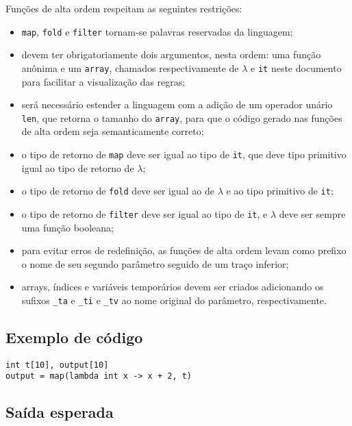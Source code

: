 \documentclass{article}
\newenvironment{smallitem}{
    \vspace{-1mm}
    \begin{itemize}
    \setlength{\parskip}{0pt}
    \setlength{\itemsep}{2pt}
}{
    \vspace{-2mm}
    \end{itemize}
}
\begin{document}
Funções de alta ordem respeitam as seguintes restrições:
\begin{smallitem}
    \item \texttt{map}, \texttt{fold} e \texttt{filter} tornam-se palavras
        reservadas da linguagem;
    \item devem ter obrigatoriamente dois argumentos, nesta ordem: uma função
        anônima e um \texttt{array}, chamados respectivamente
        de \texttt{$\lambda$} e \texttt{it} neste documento para facilitar a
        visualização das regras;
    \item será necessário estender a linguagem com a adição de um operador
        unário \texttt{len}, que retorna o tamanho do \texttt{array}, para que
        o código gerado nas funções de alta ordem seja semanticamente correto;
    \item o tipo de retorno de \texttt{map} deve ser igual ao tipo de
        \texttt{it}, que deve tipo primitivo igual ao tipo de retorno
        de \texttt{$\lambda$};
    \item o tipo de retorno de \texttt{fold} deve ser igual ao de
        \texttt{$\lambda$} e ao tipo primitivo de \texttt{it};
    \item o tipo de retorno de \texttt{filter} deve ser igual ao tipo de
        \texttt{it}, e \texttt{$\lambda$} deve ser sempre uma função booleana;
    \item para evitar erros de redefinição, as funções de alta ordem
        levam como prefixo o nome de seu segundo parâmetro seguido de
        um traço inferior;
    \item arrays, índices e variáveis temporários devem ser criados
        adicionando os sufixos \texttt{\_ta} e \texttt{\_ti} e \texttt{\_tv}
        ao nome original do parâmetro, respectivamente.
\end{smallitem}

\subsection{Exemplo de código}

\begin{verbatim}
int t[10], output[10]
output = map(lambda int x -> x + 2, t)
\end{verbatim}

\subsection{Saída esperada}
\end{document}
